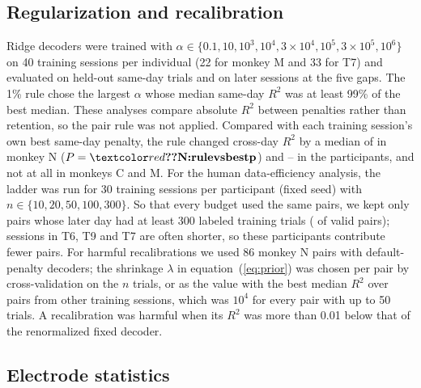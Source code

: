 \documentclass{iopjournal}
\begin{document}
\subsection{Regularization and recalibration}

Ridge decoders were trained with $\alpha \in \{0.1, 10, 10^3, 10^4, 3\times10^4, 10^5, 3\times10^5, 10^6\}$ on 40
training sessions per individual (22 for monkey M and 33 for T7) and evaluated on held-out same-day trials and on later sessions at
the five gaps. The 1\% rule chose the largest $\alpha$ whose median same-day $R^2$ was at least 99\% of the best median. These
analyses compare absolute $R^2$ between penalties rather than retention, so the pair rule was not applied.
Compared with each training session's own best same-day penalty, the rule changed cross-day $R^2$ by a median of
 in monkey N ($P = \val{N:rulevsbestp}$) and -- in the
participants, and not at all in monkeys C and M.
For the human data-efficiency analysis, the ladder was run for 30 training sessions per participant (fixed seed) with
$n \in \{10, 20, 50, 100, 300\}$. So that every budget used the same pairs, we kept only pairs whose later day had at
least 300 labeled training trials ( of  valid pairs); sessions in T6, T9 and T7 are
often shorter, so these participants contribute fewer pairs. For harmful recalibrations we used 86 monkey N pairs with default-penalty decoders; the
shrinkage $\lambda$ in equation~(\ref{eq:prior}) was chosen per pair by cross-validation on the $n$ trials, or as the value
with the best median $R^2$ over pairs from other training sessions, which was $10^4$ for every pair with up to 50
trials. A recalibration was harmful when its $R^2$ was more than 0.01 below that of the renormalized fixed decoder.

\subsection{Electrode statistics}
\end{document}
